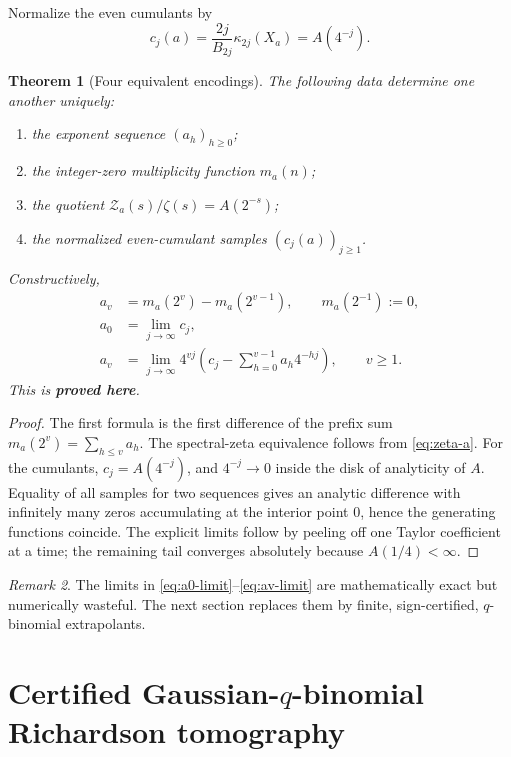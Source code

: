 \documentclass[11pt,oneside]{article}
\numberwithin{equation}{section}
\newtheorem{theorem}{Theorem}[section]
\theoremstyle{definition}
\theoremstyle{remark}
\newtheorem{remark}[theorem]{Remark}
\newcommand{\statusproved}{\textcolor{deepgreen}{\textbf{proved here}}}
\newcommand{\Zspec}{\mathcal Z}
\begin{document}
Normalize the even cumulants by
\begin{equation}
 c_j(a)=\frac{2j}{B_{2j}}\kappa_{2j}(X_a)=A(4^{-j}).
 \label{eq:cj}
\end{equation}

\begin{theorem}[Four equivalent encodings]
\label{thm:identifiability}
The following data determine one another uniquely:
\begin{enumerate}
\item the exponent sequence $(a_h)_{h\ge0}$;
\item the integer-zero multiplicity function $m_a(n)$;
\item the quotient $\Zspec_a(s)/\zeta(s)=A(2^{-s})$;
\item the normalized even-cumulant samples $(c_j(a))_{j\ge1}$.
\end{enumerate}
Constructively,
\begin{align}
 a_v&=m_a(2^v)-m_a(2^{v-1}),
 \qquad m_a(2^{-1}):=0,
 \label{eq:a-from-zero}\\
 a_0&=\lim_{j\to\infty}c_j,
 \label{eq:a0-limit}\\
 a_v&=\lim_{j\to\infty}4^{vj}
 \left(c_j-\sum_{h=0}^{v-1}a_h4^{-hj}\right),
 \qquad v\ge1.
 \label{eq:av-limit}
\end{align}
This is \statusproved.
\end{theorem}

\begin{proof}
The first formula is the first difference of the prefix sum
$m_a(2^v)=\sum_{h\le v}a_h$.  The spectral-zeta equivalence follows from
\eqref{eq:zeta-a}.  For the cumulants, $c_j=A(4^{-j})$, and
$4^{-j}\to0$ inside the disk of analyticity of $A$.  Equality of all samples for two
sequences gives an analytic difference with infinitely many zeros accumulating at the
interior point $0$, hence the generating functions coincide.  The explicit limits follow
by peeling off one Taylor coefficient at a time; the remaining tail converges absolutely
because $A(1/4)<\infty$.
\end{proof}

\begin{remark}
The limits in \eqref{eq:a0-limit}--\eqref{eq:av-limit} are mathematically exact but
numerically wasteful.  The next section replaces them by finite, sign-certified,
$q$-binomial extrapolants.
\end{remark}

\section{Certified Gaussian-$q$-binomial Richardson tomography}
\label{sec:tomography}
\end{document}
